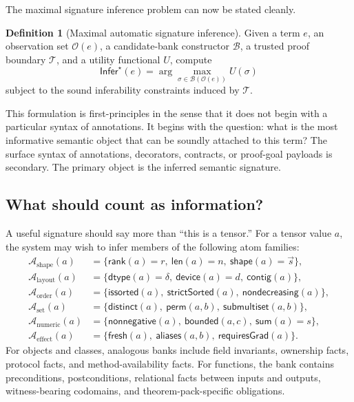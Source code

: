 \documentclass[11pt]{article}
\theoremstyle{definition}
\newtheorem{definition}{Definition}[section]
\theoremstyle{plain}
\begin{document}
The maximal signature inference problem can now be stated cleanly.

\begin{definition}[Maximal automatic signature inference]
Given a term $e$, an observation set $\mathcal{O}(e)$, a candidate-bank
constructor $\mathcal{B}$, a trusted proof boundary $\mathcal{T}$, and a utility
functional $U$, compute
\[
\mathsf{Infer}^\star(e)
= \arg\max_{\sigma \in \mathcal{B}(\mathcal{O}(e))}
U(\sigma)
\]
subject to the sound inferability constraints induced by $\mathcal{T}$.
\end{definition}

This formulation is first-principles in the sense that it does not begin with a
particular syntax of annotations. It begins with the question: what is the most
informative semantic object that can be soundly attached to this term? The
surface syntax of annotations, decorators, contracts, or proof-goal payloads is
secondary. The primary object is the inferred semantic signature.

\subsection{What should count as information?}
A useful signature should say more than ``this is a tensor.'' For a tensor value
$a$, the system may wish to infer members of the following atom families:
\begin{align*}
\mathcal{A}_{\mathrm{shape}}(a) &= \{\mathsf{rank}(a)=r,\ \mathsf{len}(a)=n,\ \mathsf{shape}(a)=\vec{s}\}, \\
\mathcal{A}_{\mathrm{layout}}(a) &= \{\mathsf{dtype}(a)=\delta,\ \mathsf{device}(a)=d,\ \mathsf{contig}(a)\}, \\
\mathcal{A}_{\mathrm{order}}(a) &= \{\mathsf{issorted}(a),\ \mathsf{strictSorted}(a),\ \mathsf{nondecreasing}(a)\}, \\
\mathcal{A}_{\mathrm{set}}(a) &= \{\mathsf{distinct}(a),\ \mathsf{perm}(a,b),\ \mathsf{submultiset}(a,b)\}, \\
\mathcal{A}_{\mathrm{numeric}}(a) &= \{\mathsf{nonnegative}(a),\ \mathsf{bounded}(a,c),\ \mathsf{sum}(a)=s\}, \\
\mathcal{A}_{\mathrm{effect}}(a) &= \{\mathsf{fresh}(a),\ \mathsf{aliases}(a,b),\ \mathsf{requiresGrad}(a)\}.
\end{align*}
For objects and classes, analogous banks include field invariants, ownership
facts, protocol facts, and method-availability facts. For functions, the bank
contains preconditions, postconditions, relational facts between inputs and
outputs, witness-bearing codomains, and theorem-pack-specific obligations.
\end{document}
